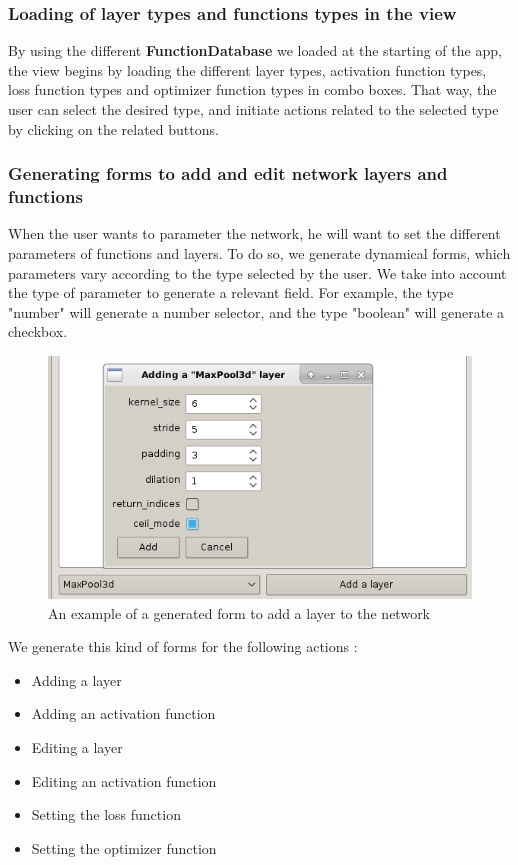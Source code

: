 \subsubsection{Loading of layer types and functions types in the view}
By using the different \textbf{FunctionDatabase} we loaded at the starting of the app, the view begins by loading the different layer types, activation function types, loss function types and optimizer function types in combo boxes. That way, the user can select the desired type, and initiate actions related to the selected type by clicking on the related buttons.
\subsubsection{Generating forms to add and edit network layers and functions}
When the user wants to parameter the network, he will want to set the different parameters of functions and layers. To do so, we generate dynamical forms, which parameters vary according to the type selected by the user. We take into account the type of parameter to generate a relevant field. For example, the type "number" will generate a number selector, and the type "boolean" will generate a checkbox.
\begin{figure}[]
    \centering 
    \includegraphics[scale=0.7]{figures/add_layer_form.png}
    \caption{An example of a generated form to add a layer to the network}
\end{figure}
\newline We generate this kind of forms for the following actions :
\begin{itemize}
    \item Adding a layer
    \item Adding an activation function
    \item Editing a layer
    \item Editing an activation function
    \item Setting the loss function
    \item Setting the optimizer function
\end{itemize}
